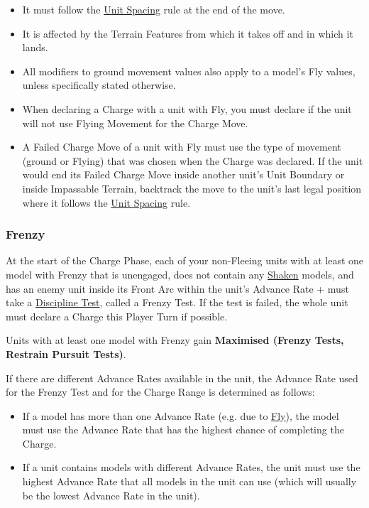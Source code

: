 \begin{itemize}
	\item It must follow the \hyperref[unit_spacing]{Unit Spacing} rule at the end of the move.
	\item It is affected by the Terrain Features from which it takes off and in which it lands.
	\item All modifiers to ground movement values also apply to a model's Fly values, unless specifically stated otherwise.
	\item When declaring a Charge with a unit with Fly, you must declare if the unit will not use Flying Movement for the Charge Move.
	\item A Failed Charge Move of a unit with Fly must use the type of movement (ground or Flying) that was chosen when the Charge was declared. If the unit would end its Failed Charge Move inside another unit's Unit Boundary or inside Impassable Terrain, backtrack the move to the unit's last legal position where it follows the \hyperref[unit_spacing]{Unit Spacing} rule.
\end{itemize}

\subsubsection{Frenzy}
\idx[main=y]{\frenzy}\label{frenzy}

At the start of the Charge Phase, each of your non-Fleeing units with at least one model with Frenzy that is unengaged, does not contain any \hyperref[shaken]{Shaken} models, and has an enemy unit inside its Front Arc within the unit's Advance Rate + must take a \hyperref[discipline_tests]{Discipline Test}, called a Frenzy Test. If the test is failed, the whole unit must declare a Charge this Player Turn if possible.

Units with at least one model with Frenzy gain \textbf{Maximised (Frenzy Tests, Restrain Pursuit Tests)}.


If there are different Advance Rates available in the unit, the Advance Rate used for the Frenzy Test and for the Charge Range is determined as follows:

\begin{itemize}
	\item If a model has more than one Advance Rate (e.g. due to \hyperref[fly]{Fly}), the model must use the Advance Rate that has the highest chance of completing the Charge.
	\item If a unit contains models with different Advance Rates, the unit must use the highest Advance Rate that all models in the unit can use (which will usually be the lowest Advance Rate in the unit).
\end{itemize}

